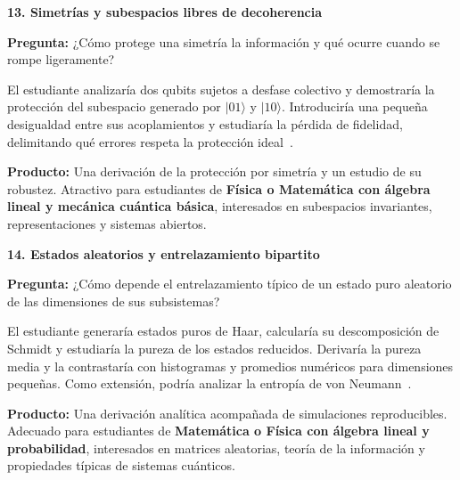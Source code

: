 \documentclass[11pt,a4paper]{article}
\newcommand{\tema}[5]{%
\noindent\begin{minipage}{\linewidth}\raggedright
\textbf{#1. #2}\par
\textbf{Pregunta:} #3\par
#4\par
\textbf{Producto:} #5
\end{minipage}\par\vspace{9pt}}
\begin{document}
\tema{13}{Simetrías y subespacios libres de decoherencia}
{¿Cómo protege una simetría la información y qué ocurre cuando se rompe ligeramente?}
{El estudiante analizaría dos qubits sujetos a desfase colectivo y demostraría la protección del subespacio generado por $|01\rangle$ y $|10\rangle$. Introduciría una pequeña desigualdad entre sus acoplamientos y estudiaría la pérdida de fidelidad, delimitando qué errores respeta la protección ideal~\cite{dfs}.}
{Una derivación de la protección por simetría y un estudio de su robustez. Atractivo para estudiantes de \textbf{Física o Matemática con álgebra lineal y mecánica cuántica básica}, interesados en subespacios invariantes, representaciones y sistemas abiertos.}

\tema{14}{Estados aleatorios y entrelazamiento bipartito}
{¿Cómo depende el entrelazamiento típico de un estado puro aleatorio de las dimensiones de sus subsistemas?}
{El estudiante generaría estados puros de Haar, calcularía su descomposición de Schmidt y estudiaría la pureza de los estados reducidos. Derivaría la pureza media y la contrastaría con histogramas y promedios numéricos para dimensiones pequeñas. Como extensión, podría analizar la entropía de von Neumann~\cite{randomstates}.}
{Una derivación analítica acompañada de simulaciones reproducibles. Adecuado para estudiantes de \textbf{Matemática o Física con álgebra lineal y probabilidad}, interesados en matrices aleatorias, teoría de la información y propiedades típicas de sistemas cuánticos.}
\end{document}
